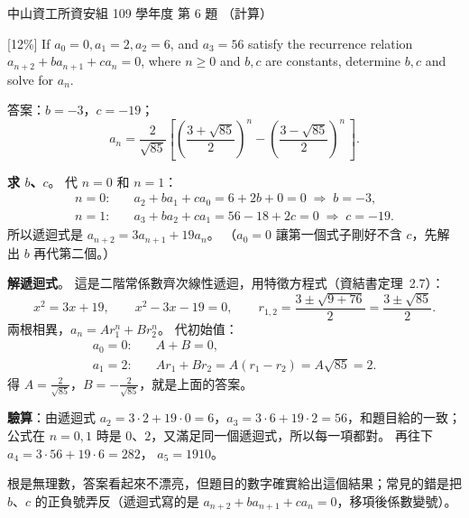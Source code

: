 \begin{pastexam}[label={px:nsysu-109-dmalg-03}]{中山資工所資安組 109 學年度 第 6 題}
（計算）

{[12\%]} If $a_0=0, a_1=2, a_2=6$, and $a_3=56$ satisfy the recurrence relation
$a_{n+2}+ba_{n+1}+ca_n=0$, where $n\ge 0$ and $b,c$ are constants, determine $b,c$ and solve for $a_n$.
\end{pastexam}

\begin{pastsoln}
答案：$b = -3$，$c = -19$；
\[
a_n = \frac{2}{\sqrt{85}}\left[\left(\frac{3 + \sqrt{85}}{2}\right)^{\!n} - \left(\frac{3 - \sqrt{85}}{2}\right)^{\!n}\,\right].
\]

\textbf{求 $b$、$c$}。 代 $n = 0$ 和 $n = 1$：
\begin{align*}
n = 0:&\quad a_2 + b a_1 + c a_0 = 6 + 2b + 0 = 0 \;\Rightarrow\; b = -3,\\
n = 1:&\quad a_3 + b a_2 + c a_1 = 56 - 18 + 2c = 0 \;\Rightarrow\; c = -19.
\end{align*}
所以遞迴式是 $a_{n+2} = 3a_{n+1} + 19a_n$。 （$a_0 = 0$ 讓第一個式子剛好不含 $c$，先解出 $b$ 再代第二個。）

\textbf{解遞迴式}。 這是二階常係數齊次線性遞迴，用特徵方程式（資結書定理~2.7）：
\[
x^2 = 3x + 19, \qquad x^2 - 3x - 19 = 0, \qquad r_{1,2} = \frac{3 \pm \sqrt{9 + 76}}{2} = \frac{3 \pm \sqrt{85}}{2}.
\]
兩根相異，$a_n = A r_1^n + B r_2^n$。 代初始值：
\begin{align*}
a_0 = 0:&\quad A + B = 0,\\
a_1 = 2:&\quad A r_1 + B r_2 = A(r_1 - r_2) = A\sqrt{85} = 2 .
\end{align*}
得 $A = \frac{2}{\sqrt{85}}$，$B = -\frac{2}{\sqrt{85}}$，就是上面的答案。

\textbf{驗算}：由遞迴式 $a_2 = 3 \cdot 2 + 19 \cdot 0 = 6$，$a_3 = 3 \cdot 6 + 19 \cdot 2 = 56$，和題目給的一致；公式在
$n = 0, 1$ 時是 $0$、$2$，又滿足同一個遞迴式，所以每一項都對。 再往下 $a_4 = 3 \cdot 56 + 19 \cdot 6 = 282$，
$a_5 = 1910$。

根是無理數，答案看起來不漂亮，但題目的數字確實給出這個結果；常見的錯是把 $b$、$c$ 的正負號弄反（遞迴式寫的是
$a_{n+2} + ba_{n+1} + ca_n = 0$，移項後係數變號）。
\end{pastsoln}
